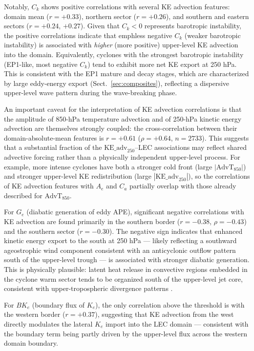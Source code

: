 Notably, $C_k$ shows positive correlations with several KE advection features:
domain mean ($r = +0.33$), northern sector ($r = +0.26$), and southern and eastern
sectors ($r = +0.24$, $+0.27$). Given that $C_k < 0$ represents barotropic instability,
the positive correlations indicate that 
emph{less} negative $C_k$ (weaker barotropic instability) is associated with
\emph{higher} (more positive) upper-level KE advection into the domain. Equivalently,
cyclones with the strongest barotropic instability (EP1-like, most negative $C_k$)
tend to exhibit more net KE export at 250 hPa. This is consistent with the EP1 mature
and decay stages, which are characterized by large eddy-energy export
(Sect.~\ref{sec:composites}), reflecting a dispersive upper-level wave pattern
during the wave-breaking phase.

An important caveat for the interpretation of KE advection correlations is that
the amplitude of 850-hPa temperature advection and of 250-hPa kinetic energy advection
are themselves strongly coupled: the cross-correlation between their
domain-absolute-mean features is $r = +0.61$ ($\rho = +0.64$, $n = 2733$). This
suggests that a substantial fraction of the $\mathrm{KE\_adv}_{250}$–LEC associations
may reflect shared advective forcing rather than a physically independent upper-level
process. For example, more intense cyclones have both a stronger cold front (large
$|\mathrm{AdvT}_{850}|$) and stronger upper-level KE redistribution (large
$|\mathrm{KE\_adv}_{250}|$), so the correlations of KE advection features with $A_e$
and $C_a$ partially overlap with those already described for $\mathrm{AdvT}_{850}$.

For $G_e$ (diabatic generation of eddy APE), significant negative correlations with KE
advection are found primarily in the southern border ($r = -0.38$, $\rho = -0.43$)
and the southern sector ($r = -0.30$). The negative sign indicates that enhanced
kinetic energy export to the south at 250 hPa — likely reflecting a southward
ageostrophic wind component consistent with an anticyclonic outflow pattern south of the
upper-level trough — is associated with stronger diabatic generation. This is
physically plausible: latent heat release in convective regions embedded in the cyclone
warm sector tends to be organized south of the upper-level jet core, consistent with
upper-tropospheric divergence patterns \citep{huo1999interaction,attinger2021systematic}.

For $BK_e$ (boundary flux of $K_e$), the only correlation above the threshold is with
the western border ($r = +0.37$), suggesting that KE advection from the west directly
modulates the lateral $K_e$ import into the LEC domain — consistent with the boundary
term being partly driven by the upper-level flux across the western domain boundary.


